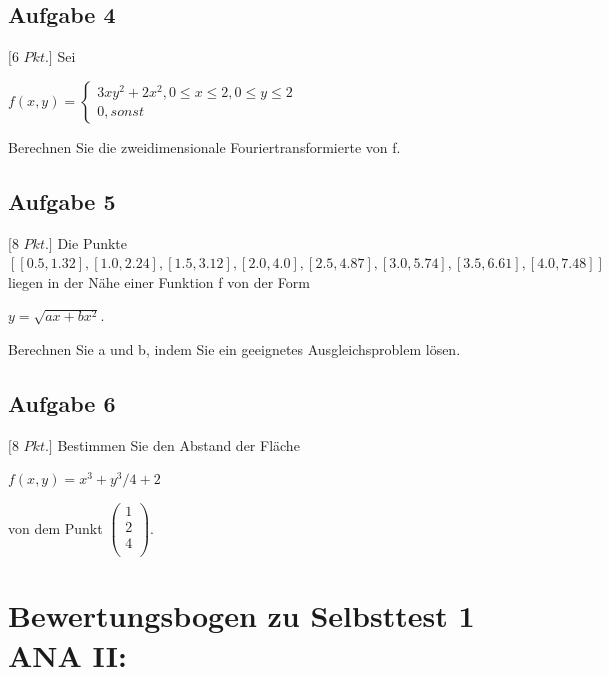 \documentclass[11pt,final]{scrreprt}
\newcommand{\br} {\medskip\\}
\begin{document}
\subsection*{Aufgabe 4}

$[6$ $Pkt.]$ Sei
\begin{center}
$
f(x,y) = \left\{
\begin{array}{l}
3 x y^2 + 2x^2, 0\leq x\leq 2,  0\leq y\leq 2 \\ 
0, sonst
\end{array}
\right.
$
\end{center}
Berechnen Sie die zweidimensionale Fouriertransformierte von f.\br

\subsection*{Aufgabe 5}

$[8$ $Pkt.]$ Die Punkte\\
$[[0.5, 1.32], [1.0, 2.24], [1.5, 3.12], [2.0, 4.0], [2.5, 4.87], [3.0, 5.74], [3.5, 6.61], [4.0, 7.48]]$\\
liegen in der Nähe einer Funktion f von der Form
\begin{center}
$y = \sqrt{ax + bx^2}.$
\end{center}
Berechnen Sie a und b, indem Sie ein geeignetes Ausgleichsproblem lösen.\br

\subsection*{Aufgabe 6}	

$[8$ $Pkt.]$ Bestimmen Sie den Abstand der Fläche\\

\begin{center}
$ f(x, y) = x^3 + y^3/4 + 2 $\\
\end{center}
von dem Punkt $\left(\begin{matrix}
1\\2\\4\\
\end{matrix}\right) $.\\

\newpage
\section*{Bewertungsbogen zu Selbsttest 1 ANA II:}
\end{document}
